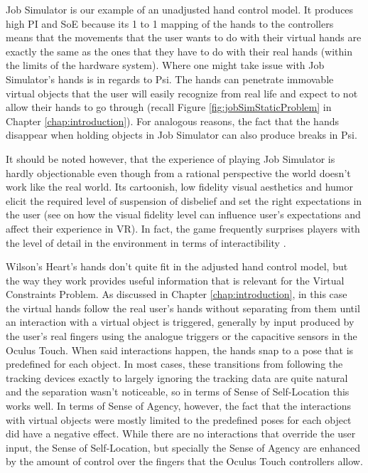 Job Simulator is our example of an unadjusted hand control model. It produces high PI and SoE because its 1 to 1 mapping of the hands to the controllers means that the movements that the user wants to do with their virtual hands are exactly the same as the ones that they have to do with their real hands (within the limits of the hardware system). Where one might take issue with Job Simulator's hands is in regards to Psi. The hands can penetrate immovable virtual objects that the user will easily recognize from real life and expect to not allow their hands to go through (recall Figure \ref{fig:jobSimStaticProblem} in Chapter \ref{chap:introduction}). For analogous reasons, the fact that the hands disappear when holding objects in Job Simulator can also produce breaks in Psi.


It should be noted however, that the experience of playing Job Simulator is hardly objectionable even though from a rational perspective the world doesn't work like the real world. Its cartoonish, low fidelity visual aesthetics and humor elicit the required level of suspension of disbelief and set the right expectations in the user (see \parencite{Nowak2003, Argelaguet2016} on how the visual fidelity level can influence user's expectations and affect their experience in VR). In fact, the game frequently surprises players with the level of detail in the environment in terms of interactibility \parencite{Schwartz2017}.


Wilson's Heart's hands don't quite fit in the adjusted hand control model, but the way they work provides useful information that is relevant for the Virtual Constraints Problem. As discussed in Chapter \ref{chap:introduction}, in this case the virtual hands follow the real user's hands without separating from them until an interaction with a virtual object is triggered, generally by input produced by the user's real fingers using the analogue triggers or the capacitive sensors in the Oculus Touch. When said interactions happen, the hands snap to a pose that is predefined for each object. In most cases, these transitions from following the tracking devices exactly to largely ignoring the tracking data are quite natural and the separation wasn't noticeable, so in terms of Sense of Self-Location this works well. In terms of Sense of Agency, however, the fact that the interactions with virtual objects were mostly limited to the predefined poses for each object did have a negative effect. While there are no interactions that override the user input, the Sense of Self-Location, but specially the Sense of Agency are enhanced by the amount of control over the fingers that the Oculus Touch controllers allow.

